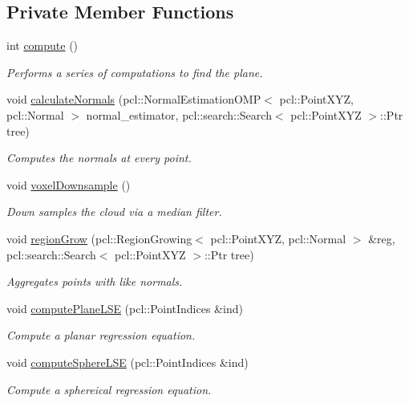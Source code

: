 \subsection*{Private Member Functions}
\begin{DoxyCompactItemize}
\item 
int \hyperlink{class_plane_a50f718840ac2c5cc3226ff66de2c60f6}{compute} ()
\begin{DoxyCompactList}\small\item\em Performs a series of computations to find the plane. \end{DoxyCompactList}\item 
void \hyperlink{class_plane_a5c856cf6a603473c68381d21a544d2a3}{calculate\+Normals} (pcl\+::\+Normal\+Estimation\+O\+MP$<$ pcl\+::\+Point\+X\+YZ, pcl\+::\+Normal $>$ normal\+\_\+estimator, pcl\+::search\+::\+Search$<$ pcl\+::\+Point\+X\+YZ $>$\+::Ptr tree)
\begin{DoxyCompactList}\small\item\em Computes the normals at every point. \end{DoxyCompactList}\item 
void \hyperlink{class_plane_afc8f76c6dc7223c7d681d69e427a3004}{voxel\+Downsample} ()
\begin{DoxyCompactList}\small\item\em Down samples the cloud via a median filter. \end{DoxyCompactList}\item 
void \hyperlink{class_plane_a08b35c23d8e0f3eea0db820163cda6e0}{region\+Grow} (pcl\+::\+Region\+Growing$<$ pcl\+::\+Point\+X\+YZ, pcl\+::\+Normal $>$ \&reg, pcl\+::search\+::\+Search$<$ pcl\+::\+Point\+X\+YZ $>$\+::Ptr tree)
\begin{DoxyCompactList}\small\item\em Aggregates points with like normals. \end{DoxyCompactList}\item 
void \hyperlink{class_plane_a503b1c82ae3a84d9bd88fbfa37a5e3be}{compute\+Plane\+L\+SE} (pcl\+::\+Point\+Indices \&ind)
\begin{DoxyCompactList}\small\item\em Compute a planar regression equation. \end{DoxyCompactList}\item 
void \hyperlink{class_plane_a60923e0c6d087076a234a9d5bd45d0fa}{compute\+Sphere\+L\+SE} (pcl\+::\+Point\+Indices \&ind)
\begin{DoxyCompactList}\small\item\em Compute a sphereical regression equation. \end{DoxyCompactList}\item 

\end{DoxyCompactItemize}
